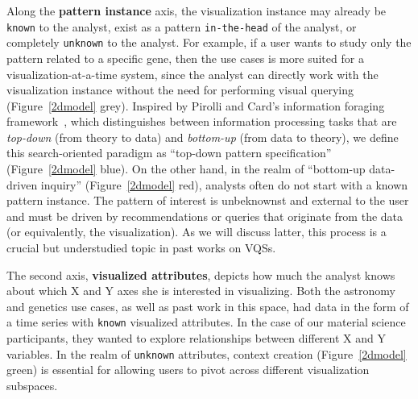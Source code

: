 \par Along the \textbf{pattern instance} axis, the visualization instance may already be \texttt{known} to the analyst, exist as a pattern \texttt{in-the-head} of the analyst, or completely \texttt{unknown} to the analyst. For example, if a user wants to study only the pattern related to a specific gene, then the use cases is more suited for a visualization-at-a-time system, since the analyst can directly work with the visualization instance without the need for performing visual querying (Figure~\ref{2dmodel} grey). Inspired by Pirolli and Card's information foraging framework~\cite{Pirolli}, which distinguishes between information processing tasks that are \textit{top-down} (from theory to data) and \textit{bottom-up} (from data to theory), we define this search-oriented paradigm as ``top-down pattern specification'' (Figure~\ref{2dmodel} blue). On the other hand, in the realm of ``bottom-up data-driven inquiry'' (Figure~\ref{2dmodel} red), analysts often do not start with a known pattern instance. The pattern of interest is unbeknownst and external to the user and must be driven by recommendations or queries that originate from the data (or equivalently, the visualization). As we will discuss latter, this process is a crucial but understudied topic in past works on VQSs.
\par The second axis, \textbf{visualized attributes}, depicts how much the analyst knows about which X and Y axes she is interested in visualizing. Both the astronomy and genetics use cases, as well as past work in this space, had data in the form of a time series with \texttt{known} visualized attributes. In the case of our material science participants, they wanted to explore relationships between different X and Y variables. In the realm of \texttt{unknown} attributes, context creation (Figure~\ref{2dmodel} green) is essential for allowing users to pivot across different visualization subspaces. %
